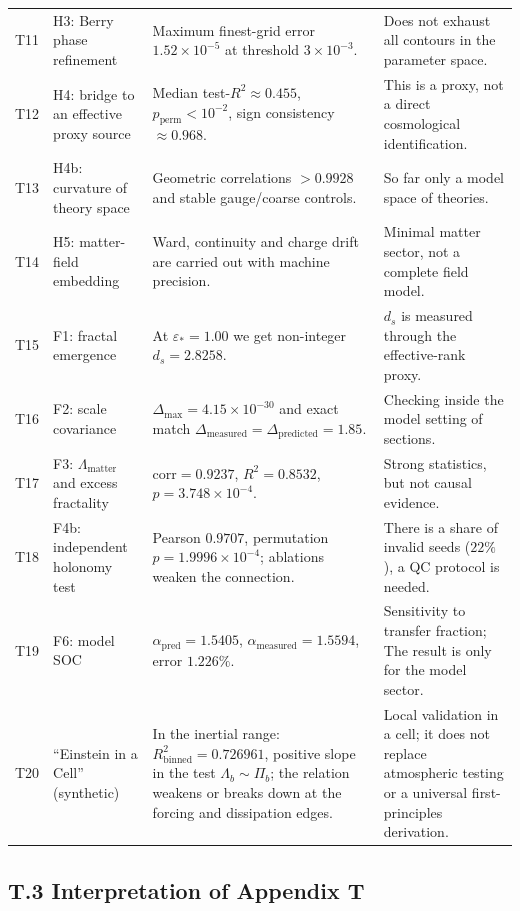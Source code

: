 \documentclass[11pt,a4paper]{article}
\theoremstyle{definition}
\theoremstyle{plain}
\theoremstyle{remark}
\begin{document}
{\begin{longtable}{@{}p{1.1cm}p{3.2cm}p{5.1cm}p{3.8cm}@{}}
T11 & H3: Berry phase refinement & Maximum finest-grid error $1.52\times10^{-5}$ at threshold $3\times10^{-3}$. & Does not exhaust all contours in the parameter space. \\
T12 & H4: bridge to an effective proxy source & Median test-$R^2\approx0.455$, $p_{\mathrm{perm}}<10^{-2}$, sign consistency $\approx0.968$. & This is a proxy, not a direct cosmological identification. \\
T13 & H4b: curvature of theory space & Geometric correlations $>0.9928$ and stable gauge/coarse controls. & So far only a model space of theories. \\
T14 & H5: matter-field embedding & Ward, continuity and charge drift are carried out with machine precision. & Minimal matter sector, not a complete field model. \\
T15 & F1: fractal emergence & At $\varepsilon_\ast=1.00$ we get non-integer $d_s=2.8258$. & $d_s$ is measured through the effective-rank proxy. \\
T16 & F2: scale covariance & $\Delta_{\max}=4.15\times10^{-30}$ and exact match $\Delta_{\mathrm{measured}}=\Delta_{\mathrm{predicted}}=1.85$. & Checking inside the model setting of sections. \\
T17 & F3: $\Lambda_{\mathrm{matter}}$ and excess fractality & $\mathrm{corr}=0.9237$, $R^2=0.8532$, $p=3.748\times10^{-4}$. & Strong statistics, but not causal evidence. \\
T18 & F4b: independent holonomy test & Pearson $0.9707$, permutation $p=1.9996\times10^{-4}$; ablations weaken the connection. & There is a share of invalid seeds ($22\%$), a QC protocol is needed. \\
T19 & F6: model SOC & $\alpha_{\mathrm{pred}}=1.5405$, $\alpha_{\mathrm{measured}}=1.5594$, error $1.226\%$. & Sensitivity to transfer fraction; The result is only for the model sector. \\
T20 & ``Einstein in a Cell'' (synthetic) & In the inertial range: $R^2_{\mathrm{binned}}=0.726961$, positive slope in the test $\Lambda_b\sim\Pi_b$; the relation weakens or breaks down at the forcing and dissipation edges. & Local validation in a cell; it does not replace atmospheric testing or a universal first-principles derivation. \\
\bottomrule
\end{longtable}
}

\subsection*{T.3 Interpretation of Appendix T}
\end{document}
